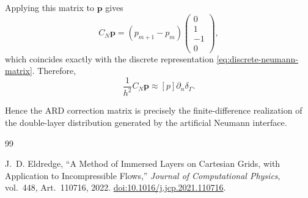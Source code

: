 \documentclass[a4paper,11pt]{article}
\begin{document}
Applying this matrix to $\mathbf p$ gives
\[
C_N\mathbf p
=
(p_{m+1}-p_m)
\begin{pmatrix}
0\\
1\\
-1\\
0
\end{pmatrix},
\]
which coincides exactly with the discrete representation
\eqref{eq:discrete-neumann-matrix}. Therefore,
\begin{equation}
\frac1{h^2}C_N\mathbf p
\approx
[p]\partial_n\delta_\Gamma.
\end{equation}

Hence the ARD correction matrix is precisely the finite-difference
realization of the double-layer distribution generated by the artificial
Neumann interface.

\begin{thebibliography}{99}

J.~D. Eldredge,
``A Method of Immersed Layers on Cartesian Grids, with Application to Incompressible Flows,''
\emph{Journal of Computational Physics},
vol.~448,
Art.~110716,
2022.
\href{https://doi.org/10.1016/j.jcp.2021.110716}
{doi:10.1016/j.jcp.2021.110716}.

\end{thebibliography}
\end{document}
